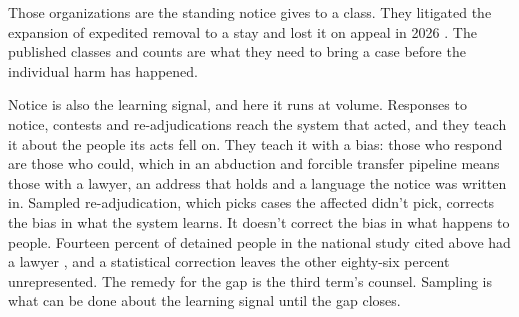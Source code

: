 Those organizations are the standing notice gives to a class. They litigated the expansion of expedited removal to a stay and lost it on appeal in 2026 \autocite{MontoyaGalvez2025Cobb,Knappenberger2026DCCir}. The published classes and counts are what they need to bring a case before the individual harm has happened.

Notice is also the learning signal, and here it runs at volume. Responses to notice, contests and re-adjudications reach the system that acted, and they teach it about the people its acts fell on. They teach it with a bias: those who respond are those who could, which in an abduction and forcible transfer pipeline means those with a lawyer, an address that holds and a language the notice was written in. Sampled re-adjudication, which picks cases the affected didn't pick, corrects the bias in what the system learns. It doesn't correct the bias in what happens to people. Fourteen percent of detained people in the national study cited above had a lawyer \autocite{EaglyShafer2016Counsel}, and a statistical correction leaves the other eighty-six percent unrepresented. The remedy for the gap is the third term's counsel. Sampling is what can be done about the learning signal until the gap closes.

